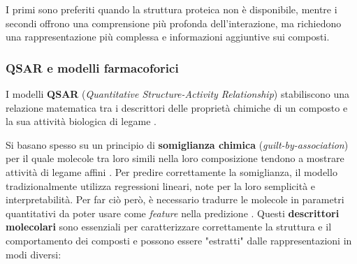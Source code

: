 I primi sono preferiti quando la struttura proteica non è disponibile, mentre i secondi offrono una comprensione più profonda dell'interazione, ma richiedono una rappresentazione più complessa e informazioni aggiuntive sui composti.
\subsubsection{QSAR e modelli farmacoforici}
I modelli \textbf{QSAR} (\textit{Quantitative Structure-Activity Relationship}) stabiliscono una relazione matematica tra i descrittori delle proprietà chimiche di un composto e la sua attività biologica di legame \cite{mondalAIdrivenDrugTarget2026a}.

Si basano spesso su un principio di \textbf{somiglianza chimica} (\textit{guilt-by-association}) per il quale molecole tra loro simili nella loro composizione tendono a mostrare attività di legame affini \cite{mondalAIdrivenDrugTarget2026a}.
Per predire correttamente la somiglianza, il modello tradizionalmente utilizza regressioni lineari, note per la loro semplicità e interpretabilità. Per far ciò però, è necessario tradurre le molecole in parametri quantitativi da poter usare come \textit{feature} nella predizione \cite{odugbemiArtificialIntelligenceAntidiabetic2024}.
Questi \textbf{descrittori molecolari} sono essenziali per caratterizzare correttamente la struttura e il comportamento dei composti e possono essere "estratti" dalle rappresentazioni in modi diversi:

